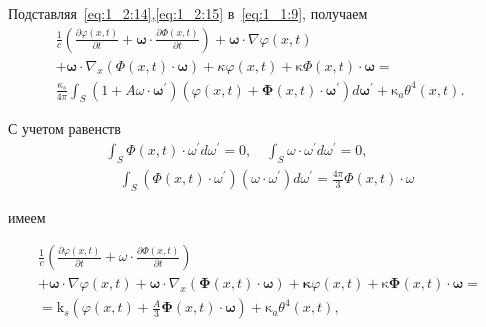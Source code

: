 
Подставляя~\eqref{eq:1_2:14},\eqref{eq:1_2:15} в~\eqref{eq:1_1:9}, получаем
\begin{gather*}
    \frac{1}{c}\left(\frac{\partial \varphi(x, t)}{\partial t}
    + \boldsymbol{\omega} \cdot \frac{\partial \Phi(x, t)}{\partial t}\right)
    + \boldsymbol{\omega} \cdot \nabla \varphi(x, t) \\
    + \boldsymbol{\omega} \cdot \nabla_{x}(\Phi(x, t) \cdot \boldsymbol{\omega})
    + \kappa \varphi(x, t)
    + \mathrm{\kappa} \Phi(x, t) \cdot \boldsymbol{\omega}= \\
    \frac{\kappa_{s}}{4 \pi} \int_{S}\left(1+A \omega \cdot
    \boldsymbol{\omega}^{\prime}\right)\left(\varphi(x, t)+\boldsymbol{\Phi}(x, t)
    \cdot \boldsymbol{\omega}^{\prime}\right) d \boldsymbol{\omega}^{\prime}
    + \mathrm{\kappa}_{a} \theta^{4}(x, t).
\end{gather*}

С учетом равенств
\begin{gather*}
    \int_{S} \Phi(x, t) \cdot \omega^{\prime} d \omega^{\prime} = 0,
    \quad \int_{S} \omega \cdot \omega^{\prime} d \omega^{\prime} = 0, \\
    \quad \int_{S}\left(\Phi(x, t) \cdot \omega^{\prime}\right)\left(\omega \cdot
    \omega^{\prime}\right) d \omega^{\prime}=\frac{4 \pi}{3} \Phi(x, t) \cdot \omega
\end{gather*}

имеем

\begin{gather*}
    \frac{1}{c}\left(\frac{\partial \varphi(x, t)}{\partial t}
    + \omega \cdot \frac{\partial \Phi(x, t)}{\partial t}\right) \\
    + \boldsymbol{\omega} \cdot \nabla \varphi(x, t)
    + \boldsymbol{\omega} \cdot \nabla_{x}
    (\boldsymbol{\Phi}(x, t) \cdot \boldsymbol{\omega})
    + \boldsymbol{\kappa} \varphi(x, t)+\mathrm{\kappa}
    \boldsymbol{\Phi}(x, t) \cdot \boldsymbol{\omega} = \\
    = \mathrm{k}_{s}\left(\varphi(x, t)+\frac{A}{3} \boldsymbol{\Phi}(x, t) \cdot
    \boldsymbol{\omega}\right)+\mathrm{\kappa}_{a} \theta^{4}(x, t),
\end{gather*}


